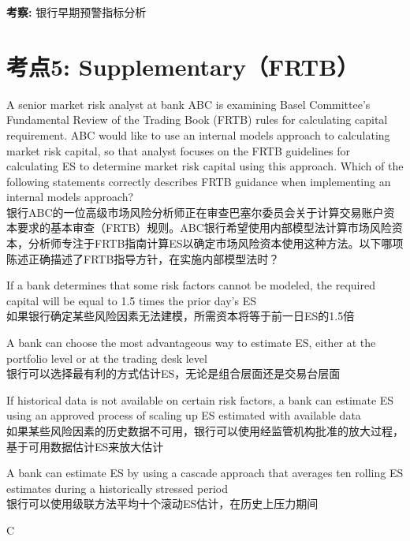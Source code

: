 \documentclass{article}
\newcounter{question} %
\newcommand{\checklist}[1]{
    \textbf{考察:} #1 \par %
    \addcontentsline{toc}{subsection}{题号\thequestion 考察: #1} %
    \vspace{2em} %
}
\begin{document}
\checklist{银行早期预警指标分析}


\section{考点5: Supplementary（FRTB）}
\setcounter{question}{0}
\begin{question}
    A senior market risk analyst at bank ABC is examining Basel Committee's Fundamental Review of the Trading Book (FRTB) rules for calculating capital requirement. ABC would like to use an internal models approach to calculating market risk capital, so that analyst focuses on the FRTB guidelines for calculating ES to determine market risk capital using this approach. Which of the following statements correctly describes FRTB guidance when implementing an internal models approach?
    \\银行ABC的一位高级市场风险分析师正在审查巴塞尔委员会关于计算交易账户资本要求的基本审查（FRTB）规则。ABC银行希望使用内部模型法计算市场风险资本，分析师专注于FRTB指南计算ES以确定市场风险资本使用这种方法。以下哪项陈述正确描述了FRTB指导方针，在实施内部模型法时？
\end{question}

\begin{choices}
    \item If a bank determines that some risk factors cannot be modeled, the required capital will be equal to 1.5 times the prior day's ES\\
    如果银行确定某些风险因素无法建模，所需资本将等于前一日ES的1.5倍
    \item A bank can choose the most advantageous way to estimate ES, either at the portfolio level or at the trading desk level\\
    银行可以选择最有利的方式估计ES，无论是组合层面还是交易台层面
    \item If historical data is not available on certain risk factors, a bank can estimate ES using an approved process of scaling up ES estimated with available data\\
    如果某些风险因素的历史数据不可用，银行可以使用经监管机构批准的放大过程，基于可用数据估计ES来放大估计
    \item A bank can estimate ES by using a cascade approach that averages ten rolling ES estimates during a historically stressed period\\
    银行可以使用级联方法平均十个滚动ES估计，在历史上压力期间
\end{choices}

\begin{correctanswer}
    C
\end{correctanswer}
\end{document}
